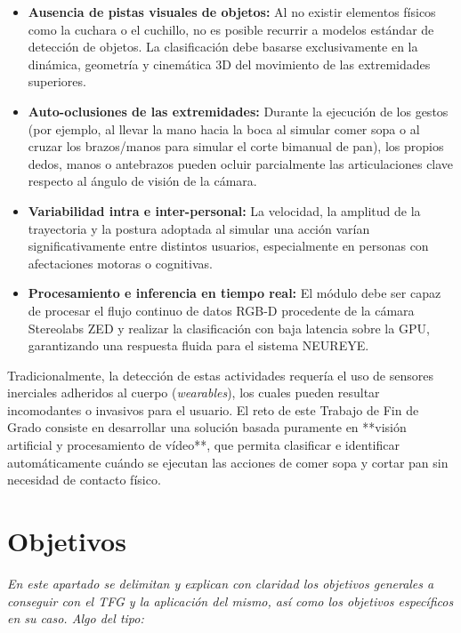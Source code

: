 \documentclass[11pt,a4paper,oneside]{article}
\begin{document}
		\begin{itemize}
			\item \textbf{Ausencia de pistas visuales de objetos:} Al no existir elementos físicos como la cuchara o el cuchillo, no es posible recurrir a modelos estándar de detección de objetos. La clasificación debe basarse exclusivamente en la dinámica, geometría y cinemática 3D del movimiento de las extremidades superiores.
			\item \textbf{Auto-oclusiones de las extremidades:} Durante la ejecución de los gestos (por ejemplo, al llevar la mano hacia la boca al simular comer sopa o al cruzar los brazos/manos para simular el corte bimanual de pan), los propios dedos, manos o antebrazos pueden ocluir parcialmente las articulaciones clave respecto al ángulo de visión de la cámara.
			\item \textbf{Variabilidad intra e inter-personal:} La velocidad, la amplitud de la trayectoria y la postura adoptada al simular una acción varían significativamente entre distintos usuarios, especialmente en personas con afectaciones motoras o cognitivas.
			\item \textbf{Procesamiento e inferencia en tiempo real:} El módulo debe ser capaz de procesar el flujo continuo de datos RGB-D procedente de la cámara Stereolabs ZED y realizar la clasificación con baja latencia sobre la GPU, garantizando una respuesta fluida para el sistema NEUREYE.
		\end{itemize}
		Tradicionalmente, la detección de estas actividades requería el uso de sensores inerciales adheridos al cuerpo (\textit{wearables}), los cuales pueden resultar incomodantes o invasivos para el usuario. El reto de este Trabajo de Fin de Grado consiste en desarrollar una solución basada puramente en **visión artificial y procesamiento de vídeo**, que permita clasificar e identificar automáticamente cuándo se ejecutan las acciones de comer sopa y cortar pan sin necesidad de contacto físico.
		
		
		
		
		
		\section{Objetivos}
		\label{sec:objetivos-y-campo}
		
		\textit{En este apartado se delimitan y explican con claridad los objetivos
			generales a conseguir con el TFG y la aplicación del mismo, así como los
			objetivos específicos en su caso. Algo del tipo:}
		
\end{document}
